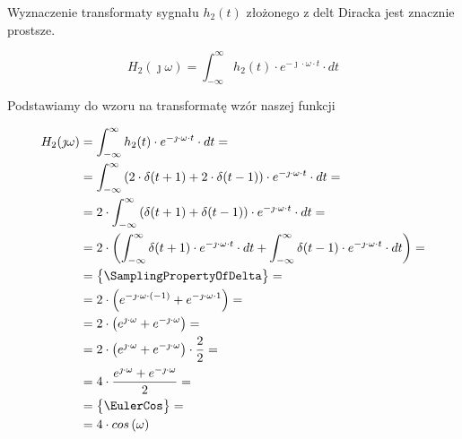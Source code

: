 \begin{task}
\begin{figure}[H]
\end{figure}

Wyznaczenie transformaty sygnału $h_2(t)$ złożonego z delt Diracka jest znacznie prostsze.

\begin{equation}
H_2(\jmath \omega )=\int_{-\infty }^{\infty}h_2(t) \cdot e^{-\jmath \cdot \omega \cdot t}\cdot dt
\end{equation}

Podstawiamy do wzoru na transformatę wzór naszej funkcji

\begin{align*}
H_2(\jmath \omega )&=\int_{-\infty }^{\infty}h_2(t) \cdot e^{-\jmath \cdot \omega \cdot t}\cdot dt=\\
&=\int_{-\infty }^{\infty}\left( 2 \cdot \delta(t+1) + 2 \cdot \delta(t-1)\right) \cdot e^{-\jmath \cdot \omega \cdot t}\cdot dt=\\
&=2 \cdot \int_{-\infty }^{\infty} \left( \delta(t+1) + \delta(t-1) \right) \cdot e^{-\jmath \cdot \omega \cdot t}\cdot dt=\\
&=2 \cdot \left( \int_{-\infty }^{\infty} \delta(t+1) \cdot e^{-\jmath \cdot \omega \cdot t}\cdot dt + \int_{-\infty }^{\infty} \delta(t-1) \cdot e^{-\jmath \cdot \omega \cdot t}\cdot dt \right)=\\
&=\begin{Bmatrix}
\SamplingPropertyOfDelta
\end{Bmatrix}=\\
&= 2 \cdot \left( e^{-\jmath \cdot \omega \cdot (-1)} + e^{-\jmath \cdot \omega \cdot 1} \right)=\\
&= 2 \cdot \left( e^{\jmath \cdot \omega} + e^{-\jmath \cdot \omega} \right)=\\
&= 2 \cdot \left( e^{\jmath \cdot \omega} + e^{-\jmath \cdot \omega} \right) \cdot \frac{2}{2}=\\
&= 4 \cdot \frac{ e^{\jmath \cdot \omega} + e^{-\jmath \cdot \omega} }{2} =\\
&=\begin{Bmatrix}
\EulerCos
\end{Bmatrix}=\\
&= 4 \cdot cos\left( \omega\right) 
\end{align*}


\end{task}
